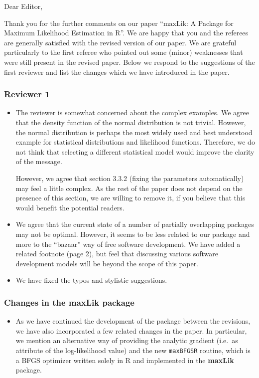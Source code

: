 \documentclass[12pt,parskip=half]{scrartcl}
\newcommand{\code}[1]{\texttt{#1}}
\newcommand{\pkg}[1]{\textbf{#1}}
\newcommand{\proglang}[1]{\textsf{#1}}
\begin{document}
Dear Editor,

\bigskip

Thank you for the further comments on our paper ``maxLik: A
Package for Maximum Likelihood Estimation in R''.
We are happy that you and the referees are generally satisfied
with the revised version of our paper.
We are grateful particularly to the first referee
who pointed out some (minor) weaknesses
that were still present in the revised paper.
Below we respond to the suggestions of the first reviewer
and list the changes which we have introduced in the paper.


\subsubsection*{Reviewer 1}

\begin{itemize}
\item The reviewer is somewhat concerned about the complex examples.
  We agree that the density function of the normal distribution is not trivial.
  However, the normal distribution is perhaps the most widely used and
  best understood example for statistical distributions and likelihood
  functions.
  Therefore, we do not think that selecting a different statistical model
  would improve the clarity of the message.

  However, we agree that section 3.3.2 (fixing the parameters
  automatically) may feel a little complex.  As the rest of the paper
  does not depend on the presence of this section, we are willing to
  remove it, if you believe that this would benefit the potential readers.
\item We agree that the current state of a number of partially
  overlapping packages may not be optimal.  However, it seems to be
  less related to our package and more to the ``bazaar'' way of free
  software development.  We have added a related footnote (page 2),
  but feel that discussing various software development models will be
  beyond the scope of this paper.
\item We have fixed the typos and stylistic suggestions.
\end{itemize}

\subsubsection*{Changes in the maxLik package}

\begin{itemize}
\item
As we have continued the development of the package between the
revisions, we have also incorporated a few related changes in the paper.  In particular,
we mention an alternative way of providing the analytic gradient
(i.e.\ as attribute of the log-likelihood value) and
the new \code{maxBFGSR} routine, which is a BFGS optimizer
written solely in \proglang{R} and implemented in the \pkg{maxLik} package.
\end{itemize}
\end{document}
